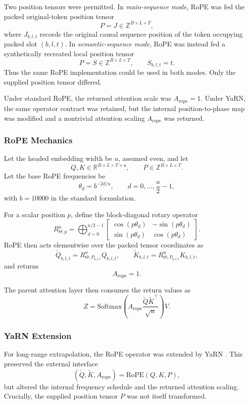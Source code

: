 \documentclass[11pt]{article}
\begin{document}
Two position tensors were permitted. In \emph{main-sequence mode}, RoPE was fed the packed original-token position tensor
\[
P = J \in \mathbb{Z}^{B \times L \times T},
\]
where $J_{b,l,t}$ records the original causal sequence position of the token occupying packed slot $(b,l,t)$. In \emph{semantic-sequence mode}, RoPE was instead fed a synthetically recreated local position tensor
\[
P = S \in \mathbb{Z}^{B \times L \times T},
\qquad
S_{b,l,t}=t.
\]
Thus the same RoPE implementation could be used in both modes. Only the supplied position tensor differed.

Under standard RoPE, the returned attention scale was $A_{\mathrm{rope}}=1$. Under YaRN, the same operator contract was retained, but the internal position-to-phase map was modified and a nontrivial attention scaling $A_{\mathrm{rope}}$ was returned.

\subsubsection{RoPE Mechanics}

Let the headed embedding width be $u$, assumed even, and let
\[
Q,K \in \mathbb{R}^{B \times L \times T \times u},
\qquad
P \in \mathbb{Z}^{B \times L \times T}.
\]
Let the base RoPE frequencies be
\[
\theta_d = b^{-2d/u},
\qquad
d=0,\dots,\frac{u}{2}-1,
\]
with $b=10000$ in the standard formulation.

For a scalar position $p$, define the block-diagonal rotary operator
\[
R_{\Theta,p}^{u}
=
\bigoplus_{d=0}^{u/2-1}
\begin{bmatrix}
\cos(p\theta_d) & -\sin(p\theta_d) \\
\sin(p\theta_d) & \cos(p\theta_d)
\end{bmatrix}.
\]
RoPE then acts elementwise over the packed tensor coordinates as
\[
\tilde{Q}_{b,l,t} = R_{\Theta,P_{b,l,t}}^{u} Q_{b,l,t},
\qquad
\tilde{K}_{b,l,t} = R_{\Theta,P_{b,l,t}}^{u} K_{b,l,t},
\]
and returns
\[
A_{\mathrm{rope}}=1.
\]

The parent attention layer then consumes the return values as
\[
Z = \mathrm{Softmax}\!\left(
A_{\mathrm{rope}}\frac{\tilde{Q}\tilde{K}^{\top}}{\sqrt{u}}
\right)V.
\]

\subsubsection{YaRN Extension}

For long-range extrapolation, the RoPE operator was extended by YaRN \cite{peng2024yarn}. This preserved the external interface
\[
(\tilde{Q}, \tilde{K}, A_{\mathrm{rope}})=\mathrm{RoPE}(Q,K,P),
\]
but altered the internal frequency schedule and the returned attention scaling. Crucially, the supplied position tensor $P$ was not itself transformed.
\end{document}
